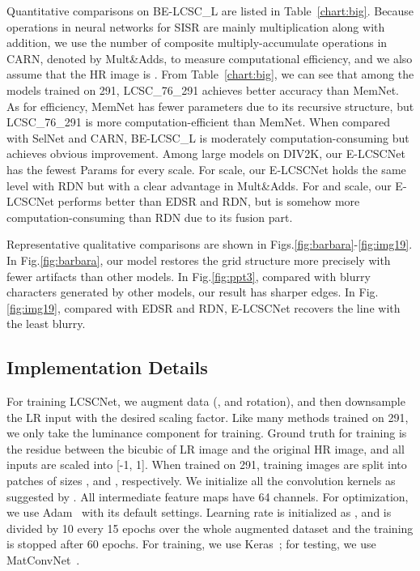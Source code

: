 \documentclass[journal]{IEEEtran}
\begin{document}
Quantitative comparisons on BE-LCSC\_L are listed in Table~\ref{chart:big}. Because operations in neural networks for SISR are mainly multiplication along with addition, we use the number of composite multiply-accumulate operations in CARN, denoted by Mult\&Adds, to measure computational efficiency, and we also assume that the HR image is . From Table~\ref{chart:big}, we can see that among the models trained on 291, LCSC\_76\_291 achieves better accuracy than MemNet. As for efficiency, MemNet has fewer parameters due to its recursive structure, but LCSC\_76\_291 is more computation-efficient than MemNet. When compared with SelNet and CARN, BE-LCSC\_L is moderately computation-consuming but achieves obvious improvement. Among large models on DIV2K, our E-LCSCNet has the fewest Params for every scale. For  scale, our E-LCSCNet holds the same level with RDN but with a clear advantage in Mult\&Adds. For  and  scale, our E-LCSCNet performs better than EDSR and RDN, but is somehow more computation-consuming than RDN due to its fusion part. 

Representative qualitative comparisons are shown in Figs.\ref{fig:barbara}-\ref{fig:img19}. In Fig.\ref{fig:barbara}, our model restores the grid structure more precisely with fewer artifacts than other models. In Fig.\ref{fig:ppt3}, compared with blurry characters generated by other models, our result has sharper edges. In Fig.\ref{fig:img19}, compared with EDSR and RDN, E-LCSCNet recovers the line with the least blurry.   

\subsection{Implementation Details}
For training LCSCNet, we augment data (,  and  rotation), and then downsample the LR input with the desired scaling factor. Like many methods trained on 291, we only take the luminance component for training. Ground truth for training is the residue between the bicubic of LR image and the original HR image, and all inputs are scaled into [-1, 1]. When trained on 291, training images are split into patches of sizes ,  and , respectively. We initialize all the convolution kernels as suggested by \cite{he2015delving}. All intermediate feature maps have 64 channels. For optimization, we use Adam~\cite{kingma2014adam} with its default settings. Learning rate is initialized as , and is divided by 10 every 15 epochs over the whole augmented dataset and the training is stopped after 60 epochs. For training, we use Keras~\cite{chollet2015keras}; for testing, we use MatConvNet~\cite{vedaldi2015matconvnet}. 
\end{document}
